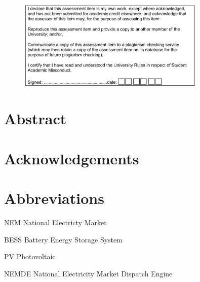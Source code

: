 \documentclass[11pt,fleqn]{book} %
\makeatletter
\newcommand{\tocfill}{\cleaders\hbox{$\m@th \mkern\@dotsep mu . \mkern\@dotsep mu$}\hfill}
\newcommand{\abbrlabel}[1]{\makebox[3cm][l]{\textbf{#1}\ \tocfill}}
\newenvironment{abbreviations}{\begin{list}{}{\renewcommand{\makelabel}{\abbrlabel}%
                                              \setlength{\itemsep}{0pt}}}{\end{list}}
\makeatother
\begin{document}
\begin{figure}[H]
    \centering
    \includegraphics[width=0.8\textwidth]{Pictures/declaration.PNG}
\end{figure}


\clearpage
\thispagestyle{empty}


\chapter*{Abstract}
\chapter*{Acknowledgements}
\chapter*{Abbreviations}
\begin{abbreviations}
\item[NEM] National Electricty Market
\item[BESS] Battery Energy Storage System
\item[PV] Photovoltaic
\item[NEMDE] National Electricity Market Dispatch Engine
\end{abbreviations}
\end{document}
